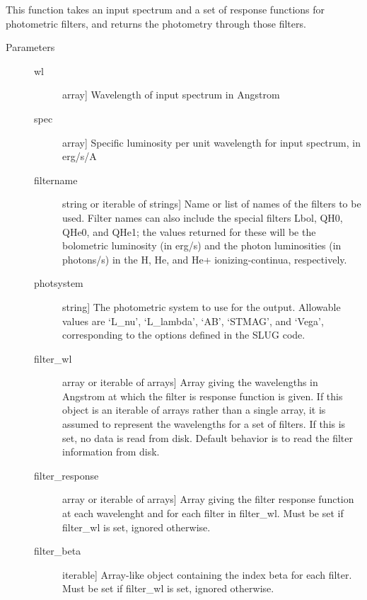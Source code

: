 \documentclass[letterpaper,10pt,english]{sphinxmanual}
\begin{document}
\begin{fulllineitems}
\label{slugpy:slugpy.compute_photometry}
This function takes an input spectrum and a set of response
functions for photometric filters, and returns the photometry
through those filters.
\begin{description}
\item[{Parameters}] \leavevmode\begin{description}
\item[{wl}] \leavevmode{[}array{]}
Wavelength of input spectrum in Angstrom

\item[{spec}] \leavevmode{[}array{]}
Specific luminosity per unit wavelength for input spectrum, in
erg/s/A

\item[{filtername}] \leavevmode{[}string or iterable of strings{]}
Name or list of names of the filters to be used. Filter names
can also include the special filters Lbol, QH0, QHe0, and QHe1;
the values returned for these will be the bolometric luminosity
(in erg/s) and the photon luminosities (in photons/s) in the H,
He, and He+ ionizing-continua, respectively.

\item[{photsystem}] \leavevmode{[}string{]}
The photometric system to use for the output. Allowable values
are `L\_nu', `L\_lambda', `AB', `STMAG', and `Vega',
corresponding to the options defined in the SLUG code.

\item[{filter\_wl}] \leavevmode{[}array or iterable of arrays{]}
Array giving the wavelengths in Angstrom at which the filter is
response function is given. If this object is an iterable of
arrays rather than a single array, it is assumed to represent
the wavelengths for a set of filters. If this is set,
no data is read from disk. Default behavior is to read the
filter information from disk.

\item[{filter\_response}] \leavevmode{[}array or iterable of arrays{]}
Array giving the filter response function at each wavelenght
and for each filter in filter\_wl. Must be set if filter\_wl is
set, ignored otherwise.

\item[{filter\_beta}] \leavevmode{[}iterable{]}
Array-like object containing the index beta for each
filter. Must be set if filter\_wl is set, ignored otherwise.


\end{description}
\end{description}
\end{fulllineitems}
\end{document}
